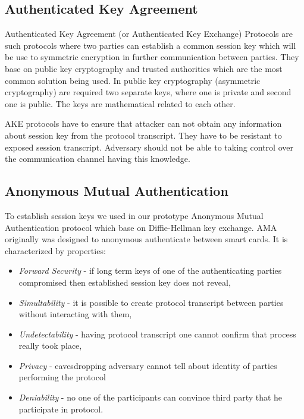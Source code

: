 \documentclass[11pt,titlepage]{article}
\theoremstyle{plain}
\begin{document}
\subsection{Authenticated Key Agreement}
Authenticated Key Agreement (or Authenticated Key Exchange) Protocols are such protocols where two parties can establish a common session key which will be use to symmetric encryption in further communication between parties. They base on public key cryptography and trusted authorities which are the most common solution being used. In public key cryptography (asymmetric cryptography) are required two separate keys, where one is private and second one is public. The keys are mathematical related to each other.

\vspace{5mm}

AKE protocols have to ensure that attacker can not obtain any information about session key from the protocol transcript. They have to be resistant to exposed session transcript. Adversary should not be able to taking control over the communication channel having this knowledge.



\subsection{Anonymous Mutual Authentication}
To establish session keys we used in our prototype Anonymous Mutual Authentication protocol which base on Diffie-Hellman key exchange.
AMA originally was designed to anonymous authenticate between smart cards. It is characterized by properties:
\begin{itemize}
\item \textit{Forward Security} - if long term keys of one of the authenticating parties compromised then established session key does not reveal,
\item \textit{Simultability} - it is possible to create protocol transcript between parties without interacting with them,
\item \textit{Undetectability} - having protocol transcript one cannot confirm that process really took place,
\item \textit{Privacy} - eavesdropping adversary cannot tell about identity of parties performing the protocol
\item \textit{Deniability} - no one of the participants can convince third party that he participate in protocol.
\end{itemize}
\end{document}
